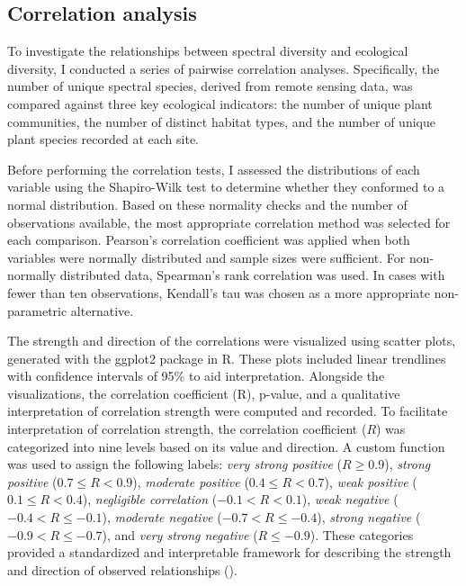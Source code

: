 \subsection{Correlation analysis}
To investigate the relationships between spectral diversity and ecological diversity, I conducted a series of pairwise correlation analyses. Specifically, the number of unique spectral species, derived from remote sensing data, was compared against three key ecological indicators: the number of unique plant communities, the number of distinct habitat types, and the number of unique plant species recorded at each site.

Before performing the correlation tests, I assessed the distributions of each variable using the Shapiro-Wilk test to determine whether they conformed to a normal distribution. Based on these normality checks and the number of observations available, the most appropriate correlation method was selected for each comparison. Pearson’s correlation coefficient was applied when both variables were normally distributed and sample sizes were sufficient. For non-normally distributed data, Spearman’s rank correlation was used. In cases with fewer than ten observations, Kendall’s tau was chosen as a more appropriate non-parametric alternative.

The strength and direction of the correlations were visualized using scatter plots, generated with the ggplot2 package in R. These plots included linear trendlines with confidence intervals of 95\% to aid interpretation. Alongside the visualizations, the correlation coefficient (R), p-value, and a qualitative interpretation of correlation strength were computed and recorded. To facilitate interpretation of correlation strength, the correlation coefficient ($R$) was categorized into nine levels based on its value and direction. A custom function was used to assign the following labels: \emph{very strong positive} ($R \geq 0.9$), \emph{strong positive} ($0.7 \leq R < 0.9$), \emph{moderate positive} ($0.4 \leq R < 0.7$), \emph{weak positive} ($0.1 \leq R < 0.4$), \emph{negligible correlation} ($-0.1 < R < 0.1$), \emph{weak negative} ($-0.4 < R \leq -0.1$), \emph{moderate negative} ($-0.7 < R \leq -0.4$), \emph{strong negative} ($-0.9 < R \leq -0.7$), and \emph{very strong negative} ($R \leq -0.9$). These categories provided a standardized and interpretable framework for describing the strength and direction of observed relationships (\cite{schober_correlation_2018}).

